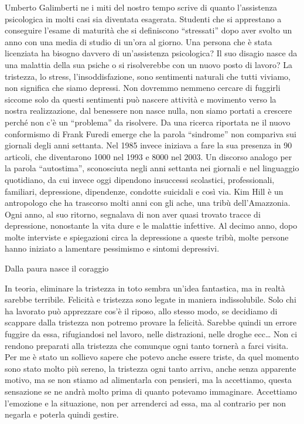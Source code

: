 \documentclass[12pt]{book} %
\begin{document}
\begin{mdframed}[linewidth=1pt]
Umberto Galimberti ne i miti del nostro tempo scrive di quanto
l'assistenza psicologica in molti casi sia diventata esagerata. Studenti che si apprestano a
conseguire l'esame di maturità che si definiscono “stressati” dopo aver svolto un anno con una
media di studio di un'ora al giorno. Una persona che è stata licenziata ha bisogno davvero di
un'assistenza psicologica? Il suo disagio nasce da una malattia della sua psiche o si risolverebbe
con un nuovo posto di lavoro? La tristezza, lo stress, l'insoddisfazione, sono sentimenti naturali
che tutti viviamo, non significa che siamo depressi. Non dovremmo nemmeno cercare di fuggirli siccome solo da questi
sentimenti può nascere attività e movimento verso la nostra realizzazione, dal benessere non nasce nulla, non siamo
portati a crescere perché non c'è un “problema” da risolvere. Da una ricerca riportata ne il nuovo
conformismo di Frank
Furedi emerge che la parola “sindrome” non compariva sui giornali degli anni settanta. Nel 1985 invece iniziava a fare
la sua presenza in 90 articoli, che diventarono 1000 nel 1993 e 8000 nel 2003. Un discorso analogo per la parola
“autostima”, sconosciuta negli anni settanta nei giornali e nel linguaggio quotidiano, da cui invece oggi dipendono
insuccessi scolastici, professionali, familiari, depressione, dipendenze, condotte suicidali e così via. Kim Hill è un
antropologo che ha trascorso molti anni con gli ache, una tribù dell'Amazzonia. Ogni anno, al suo
ritorno, segnalava di non aver quasi trovato tracce di depressione, nonostante la vita dure e le malattie infettive. Al
decimo anno, dopo molte interviste e spiegazioni circa la depressione a queste tribù, molte persone hanno iniziato a
lamentare pessimismo e sintomi depressivi.
\end{mdframed}

\bigskip

Dalla paura nasce il coraggio

In teoria, eliminare la tristezza in toto sembra un'idea fantastica, ma in realtà sarebbe terribile. Felicità e
tristezza sono legate in maniera indissolubile. Solo chi ha lavorato può apprezzare cos'è il riposo, allo stesso modo,
se decidiamo di scappare dalla tristezza non potremo provare la felicità. Sarebbe quindi un errore fuggire da essa,
rifugiandosi nel lavoro, nelle distrazioni, nelle droghe ecc… Non ci rendono preparati alla tristezza che comunque ogni
tanto tornerà a farci visita. Per me è stato un sollievo sapere che potevo anche essere triste, da quel momento sono
stato molto più sereno, la tristezza ogni tanto arriva, anche senza apparente motivo, ma se non stiamo ad alimentarla
con pensieri, ma la accettiamo, questa sensazione se ne andrà molto prima di quanto potevamo immaginare. Accettiamo
l'emozione e la situazione, non per arrenderci ad essa, ma al contrario per non negarla e poterla
quindi gestire.
\end{document}
